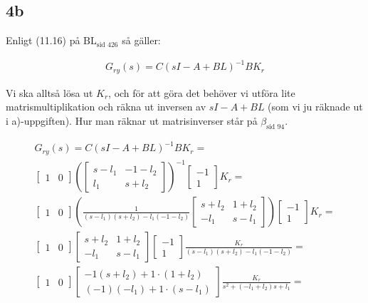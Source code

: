 \documentclass[a4paper]{article}
\newcommand{\mhb}[1]{$\beta_{\text{#1}}$}     %
\newcommand{\bl}[1]{$\text{BL}_{\text{#1}}$}  %
\begin{document}
\subsection{4b}
Enligt (11.16) på \bl{sid 426} så gäller:

\begin{align*}
  G_{ry}(s) = C(sI - A + BL)^{-1}BK_r
\end{align*}

Vi ska alltså lösa ut $K_r$, och för att göra det behöver vi utföra lite matrismultiplikation och räkna ut inversen av $sI - A + BL$ (som vi ju räknade ut i a)-uppgiften). Hur man räknar ut matrisinverser står på \mhb{sid 94}.

\begin{align*}
  G_{ry}(s) = C(sI - A + BL)^{-1}BK_r = \\
  \begin{bmatrix}1 & 0\end{bmatrix} \left(\begin{bmatrix}s - l_1 & -1 -l_2 \\ l_1 & s + l_2\end{bmatrix} \right)^{-1} \begin{bmatrix}-1 \\ 1\end{bmatrix} K_r = \\
  \begin{bmatrix}1 & 0\end{bmatrix} \left(\frac{1}{(s-l_1)(s+l_2) - l_1(-1-l_2)}\begin{bmatrix}s + l_2 & 1 +l_2 \\ -l_1 & s - l_1\end{bmatrix} \right) \begin{bmatrix}-1 \\ 1\end{bmatrix} K_r = \\
  \begin{bmatrix}1 & 0\end{bmatrix} \begin{bmatrix}s + l_2 & 1 +l_2 \\ -l_1 & s - l_1\end{bmatrix} \begin{bmatrix}-1 \\ 1\end{bmatrix} \frac{K_r}{(s-l_1)(s+l_2) - l_1(-1-l_2)} = \\
  \begin{bmatrix}1 & 0\end{bmatrix} \begin{bmatrix}-1(s + l_2) + 1\cdot(1 +l_2) \\ (-1)(-l_1) + 1\cdot(s - l_1)\end{bmatrix} \frac{K_r}{s^2 + (-l_1 + l_2)s + l_1} = \\

\end{align*}
\end{document}
